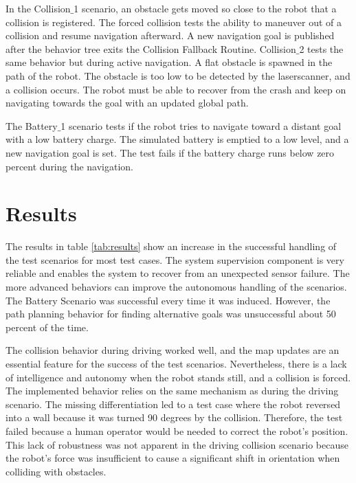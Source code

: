 In the Collision$\_$1 scenario, an obstacle gets moved so close to the robot that a collision is registered. The forced collision tests the ability to maneuver out of a collision and resume navigation afterward. A new navigation goal is published after the behavior tree exits the Collision Fallback Routine. Collision$\_$2 tests the same behavior but during active navigation. A flat obstacle is spawned in the path of the robot. The obstacle is too low to be detected by the laserscanner, and a collision occurs. The robot must be able to recover from the crash and keep on navigating towards the goal with an updated global path. 

The Battery$\_$1 scenario tests if the robot tries to navigate toward a distant goal with a low battery charge. The simulated battery is emptied to a low level, and a new navigation goal is set. The test fails if the battery charge runs below zero percent during the navigation.

\section{Results}

The results in table \ref{tab:results} show an increase in the successful handling of the test scenarios for most test cases. The system supervision component is very reliable and enables the system to recover from an unexpected sensor failure. The more advanced behaviors can improve the autonomous handling of the scenarios. The Battery Scenario was successful every time it was induced. However, the path planning behavior for finding alternative goals was unsuccessful about 50 percent of the time. 

The collision behavior during driving worked well, and the map updates are an essential feature for the success of the test scenarios. Nevertheless, there is a lack of intelligence and autonomy when the robot stands still, and a collision is forced. The implemented behavior relies on the same mechanism as during the driving scenario. The missing differentiation led to a test case where the robot reversed into a wall because it was turned 90 degrees by the collision. Therefore, the test failed because a human operator would be needed to correct the robot's position. This lack of robustness was not apparent in the driving collision scenario because the robot's force was insufficient to cause a significant shift in orientation when colliding with obstacles. 

